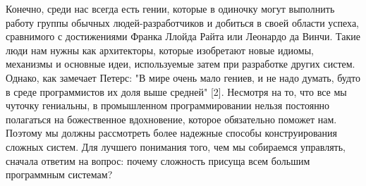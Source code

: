 \documentclass[11pt]{article}
\begin{document}
Конечно, среди нас всегда есть гении, которые в одиночку могут выполнить работу группы обычных людей-разработчиков и добиться в своей области успеха, сравнимого с достижениями Франка Ллойда Райта или Леонардо да Винчи. Такие люди нам нужны как архитекторы, которые изобретают новые идиомы, механизмы и основные идеи, используемые затем при разработке других систем. Однако, как замечает Петерс: "В мире очень мало гениев, и не надо думать, будто в среде программистов их доля выше средней" [2]. Несмотря на то, что все мы чуточку гениальны, в промышленном программировании нельзя постоянно полагаться на божественное вдохновение, которое обязательно поможет нам. Поэтому мы должны рассмотреть более надежные способы конструирования сложных систем. Для лучшего понимания того, чем мы собираемся управлять, сначала ответим на вопрос: почему сложность присуща всем большим программным системам? 
\end{document}
